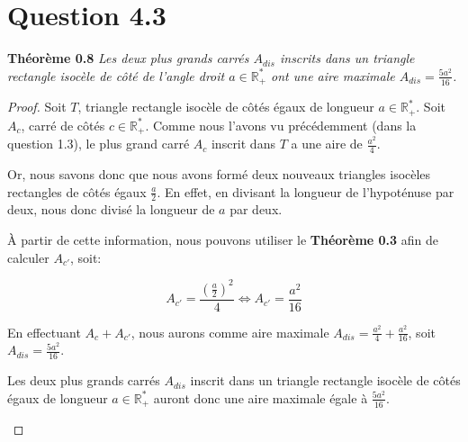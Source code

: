 \documentclass[]{amsart}
\theoremstyle{definition}
\theoremstyle{remark}
\numberwithin{equation}{section}
\begin{document}
\section*{Question 4.3}
\textbf{Théorème 0.8} \emph{Les deux plus grands carrés $A_{dis}$ inscrits dans un triangle rectangle isocèle de côté de l'angle droit $a \in \mathbb{R_{+}^{\ast}}$ ont une aire maximale $A_{dis}=\frac{5a^2}{16}$.}

\begin{proof}
Soit $T$, triangle rectangle isocèle de côtés égaux de longueur $a \in \mathbb{R_{+}^{\ast}}$. Soit $A_c$, carré de côtés $c \in \mathbb{R_{+}^{\ast}}$. Comme nous l'avons vu précédemment (dans la question 1.3), le plus grand carré $A_c$ inscrit dans $T$ a une aire de $\frac{a^2}{4}$.

Or, nous savons donc que nous avons formé deux nouveaux triangles isocèles rectangles de côtés égaux $\frac{a}{2}$. En effet, en divisant la longueur de l'hypoténuse par deux, nous donc divisé la longueur de $a$ par deux.\newline

À partir de cette information, nous pouvons utiliser le \textbf{Théorème 0.3} afin de calculer $A_{c'}$, soit:

\[A_{c'} = \frac{(\frac{a}{2})^2}{4} \Leftrightarrow A_{c'} = \frac{a^2}{16}\]

En effectuant $A_c + A_{c'}$, nous aurons comme aire maximale $A_{dis} = \frac{a^2}{4}+\frac{a^2}{16}$, soit $A_{dis} = \frac{5a^2}{16}$.

Les deux plus grands carrés $A_{dis}$ inscrit dans un triangle rectangle isocèle de côtés égaux de longueur $a \in \mathbb{R_{+}^{\ast}}$ auront donc une aire maximale égale à $\frac{5a^2}{16}$.

\begin{center}
\end{center}\newline
\end{proof}
\end{document}
